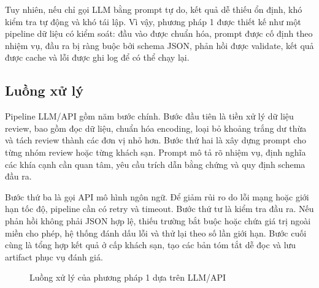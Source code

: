 Tuy nhiên, nếu chỉ gọi LLM bằng prompt tự do, kết quả dễ thiếu ổn định, khó kiểm tra tự động và khó tái lập. Vì vậy, phương pháp 1 được thiết kế như một pipeline dữ liệu có kiểm soát: đầu vào được chuẩn hóa, prompt được cố định theo nhiệm vụ, đầu ra bị ràng buộc bởi schema JSON, phản hồi được validate, kết quả được cache và lỗi được ghi log để có thể chạy lại.

\subsection{Luồng xử lý}

Pipeline LLM/API gồm năm bước chính. Bước đầu tiên là tiền xử lý dữ liệu review, bao gồm đọc dữ liệu, chuẩn hóa encoding, loại bỏ khoảng trắng dư thừa và tách review thành các đơn vị nhỏ hơn. Bước thứ hai là xây dựng prompt cho từng nhóm review hoặc từng khách sạn. Prompt mô tả rõ nhiệm vụ, định nghĩa các khía cạnh cần quan tâm, yêu cầu trích dẫn bằng chứng và quy định schema đầu ra.

Bước thứ ba là gọi API mô hình ngôn ngữ. Để giảm rủi ro do lỗi mạng hoặc giới hạn tốc độ, pipeline cần có retry và timeout. Bước thứ tư là kiểm tra đầu ra. Nếu phản hồi không phải JSON hợp lệ, thiếu trường bắt buộc hoặc chứa giá trị ngoài miền cho phép, hệ thống đánh dấu lỗi và thử lại theo số lần giới hạn. Bước cuối cùng là tổng hợp kết quả ở cấp khách sạn, tạo các bản tóm tắt dễ đọc và lưu artifact phục vụ đánh giá.

\begin{figure}[H]
\centering
{}
\caption{Luồng xử lý của phương pháp 1 dựa trên LLM/API}
\label{fig:method1-llm-pipeline}
\end{figure}


